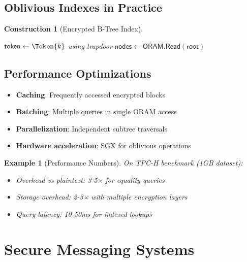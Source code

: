 \documentclass[11pt,final,hidelinks]{article}
\newtheorem{example}[theorem]{Example}
\newtheorem{construction}[theorem]{Construction}
\begin{document}
\subsection{Oblivious Indexes in Practice}

\begin{construction}[Encrypted B-Tree Index]
\begin{algorithm}[H]
\caption{Oblivious Database Index}
$\mathsf{token} \gets \Token{k}$ using trapdoor\;
$\mathsf{nodes} \gets \mathsf{ORAM.Read}(\mathsf{root})$\;
\end{algorithm}
\end{construction}

\subsection{Performance Optimizations}

\begin{itemize}
    \item \textbf{Caching}: Frequently accessed encrypted blocks
    \item \textbf{Batching}: Multiple queries in single ORAM access
    \item \textbf{Parallelization}: Independent subtree traversals
    \item \textbf{Hardware acceleration}: SGX for oblivious operations
\end{itemize}

\begin{example}[Performance Numbers]
On TPC-H benchmark (1GB dataset):
\begin{itemize}
    \item Overhead vs plaintext: 3-5× for equality queries
    \item Storage overhead: 2-3× with multiple encryption layers
    \item Query latency: 10-50ms for indexed lookups
\end{itemize}
\end{example}

\section{Secure Messaging Systems}
\end{document}
